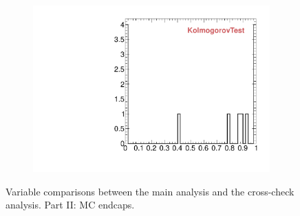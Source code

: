 \begin{figure}
\begin{subfigure}[b]{0.2\textwidth}
                \includegraphics[width=\textwidth]{Figures/VariablesComparison/MC_endcaps_figs/KS}
                \label{fig:MC_endcaps_KS}
        \end{subfigure}
        \caption{Variable comparisons between the main analysis and the cross-check analysis. Part II: MC endcaps.}
        \label{fig:MC_endcaps_figs}
\end{figure}


